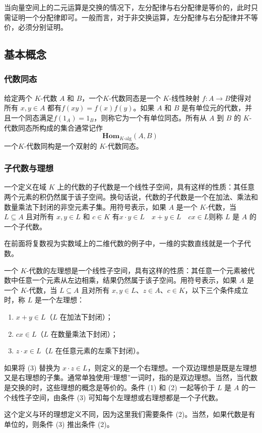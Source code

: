 当向量空间上的二元运算是交换的情况下，左分配律与右分配律是等价的，此时只需证明一个分配律即可。一般而言，对于非交换运算，左分配律与右分配律并不等价，必须分别证明。
\subsection{基本概念}
\subsubsection{代数同态}
给定两个 $K$-代数 $A$ 和 $B$，一个$K$-代数同态是一个 $K$-线性映射
$f: A \to B$使得对所有 $x, y \in A$ 都有$f(xy) = f(x) f(y)$。如果 $A$ 和 $B$ 是有单位元的代数，并且一个同态满足$f(1_A) = 1_B$，则称它为一个有单位同态。所有从 $A$ 到 $B$ 的 $K$-代数同态所构成的集合通常记作
$$
\mathbf{Hom}_{K\text{-alg}}(A, B)~
$$
一个$K$-代数同构是一个双射的 $K$-代数同态。
\subsubsection{子代数与理想}
一个定义在域 $K$ 上的代数的子代数是一个线性子空间，具有这样的性质：其任意两个元素的积仍然属于该子空间。换句话说，代数的子代数是一个在加法、乘法和数量乘法下封闭的非空元素子集。用符号表示，如果 $A$ 是一个 $K$-代数，当 $L \subseteq A$ 且对所有 $x, y \in L$ 和 $c \in K$ 有$x \cdot y \in L \quad x + y \in L \quad cx \in L$则称 $L$ 是 $A$ 的一个子代数。

在前面将复数视为实数域上的二维代数的例子中，一维的实数直线就是一个子代数。

一个 $K$-代数的左理想是一个线性子空间，具有这样的性质：其任意一个元素被代数中任意一个元素从左边相乘，结果仍然属于该子空间。用符号表示，如果 $A$ 是一个 $K$-代数，当 $L \subseteq A$ 且对所有 $x, y \in L$、$z \in A$、$c \in K$，以下三个条件成立时，称 $L$ 是一个左理想：
\begin{enumerate}
\item $x + y \in L$（$L$ 在加法下封闭）；
\item $cx \in L$（$L$ 在数量乘法下封闭）；
\item $z \cdot x \in L$（$L$ 在任意元素的左乘下封闭）。
\end{enumerate}
如果将 (3) 替换为 $x \cdot z \in L$，则定义的是一个右理想。一个双边理想是既是左理想又是右理想的子集。通常单独使用“理想”一词时，指的是双边理想。当然，当代数是交换的时，这些理想的概念是等价的。条件 (1) 和 (2) 一起等价于 $L$ 是 $A$ 的一个线性子空间，由条件 (3) 可知每个左理想或右理想都是一个子代数。

这个定义与环的理想定义不同，因为这里我们需要条件 (2)。当然，如果代数是有单位的，则条件 (3) 推出条件 (2)。
